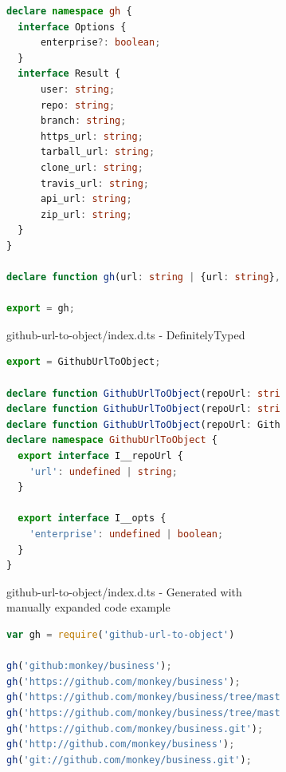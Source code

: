 \documentclass[a4paper,english,cleveref, autoref]{lipics-v2019}
\begin{document}
\begin{figure}[tp]
  \centering
  \begin{subfigure}{0.80\linewidth}
    \begin{lstlisting}[language=TypeScript]
declare namespace gh {
  interface Options {
      enterprise?: boolean;
  }
  interface Result {
      user: string;
      repo: string;
      branch: string;
      https_url: string;
      tarball_url: string;
      clone_url: string;
      travis_url: string;
      api_url: string;
      zip_url: string;
  }
}

declare function gh(url: string | {url: string}, options?: gh.Options): gh.Result | null;

export = gh;    
    \end{lstlisting}
    \caption{github-url-to-object/index.d.ts - DefinitelyTyped}
  \end{subfigure}

  \begin{subfigure}{0.80\linewidth}
    \begin{lstlisting}[language=TypeScript]
export = GithubUrlToObject;

declare function GithubUrlToObject(repoUrl: string|GithubUrlToObject.I__repoUrl, opts: undefined): object;
declare function GithubUrlToObject(repoUrl: string|GithubUrlToObject.I__repoUrl, opts: GithubUrlToObject.I__opts): null|object;
declare function GithubUrlToObject(repoUrl: GithubUrlToObject.I__repoUrl, opts: undefined): object;
declare namespace GithubUrlToObject {
  export interface I__repoUrl {
    'url': undefined | string;
  }

  export interface I__opts {
    'enterprise': undefined | boolean;
  }
}
    \end{lstlisting}
    \caption{github-url-to-object/index.d.ts - Generated with manually expanded code example}
  \end{subfigure}

  \begin{subfigure}{0.80\linewidth}
    \begin{lstlisting}[language=JavaScript]
var gh = require('github-url-to-object')

gh('github:monkey/business');
gh('https://github.com/monkey/business');
gh('https://github.com/monkey/business/tree/master');
gh('https://github.com/monkey/business/tree/master/nested/file.js');
gh('https://github.com/monkey/business.git');
gh('http://github.com/monkey/business');
gh('git://github.com/monkey/business.git');


\end{lstlisting}
\end{subfigure}
\end{figure}
\end{document}

